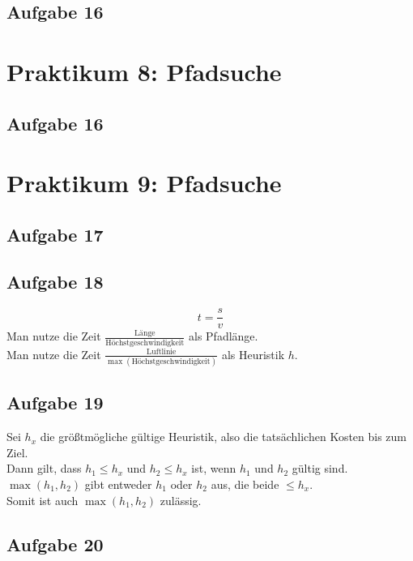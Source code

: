 \documentclass{scrreprt}
\begin{document}
\section{Aufgabe 16}


\chapter{Praktikum 8: Pfadsuche}
\section{Aufgabe 16}

\chapter{Praktikum 9: Pfadsuche}
\section{Aufgabe 17}

\section{Aufgabe 18}
$$t=\frac{s}{v}$$
Man nutze die Zeit $\frac{\text{Länge}}{\text{Höchstgeschwindigkeit}}$ als Pfadlänge.\\
Man nutze die Zeit $\frac{\text{Luftlinie}}{\max(\text{Höchstgeschwindigkeit})}$ als Heuristik $h$.

\section{Aufgabe 19}
Sei $h_x$ die größtmögliche gültige Heuristik, also die tatsächlichen Kosten bis zum Ziel.\\
Dann gilt, dass $h_1\leq h_x$ und $h_2\leq h_x$ ist, wenn $h_1$ und $h_2$ gültig sind.\\
$\max (h_1, h_2)$ gibt entweder $h_1$ oder $h_2$ aus, die beide $\leq h_x$.\\
Somit ist auch $\max (h_1, h_2)$ zulässig.

\section{Aufgabe 20}
\end{document}

